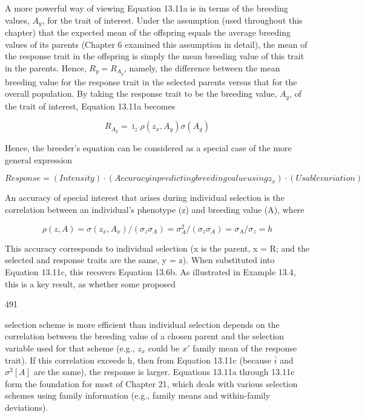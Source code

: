 \documentclass{article}
\begin{document}
A more powerful way of viewing Equation 13.11a is in terms of the breeding values,  $ A_{y} $, for the trait of interest. Under the assumption (used throughout this chapter) that the expected mean of the offspring equals the average breeding values of its parents (Chapter 6 examined this assumption in detail), the mean of the response trait in the offspring is simply the mean breeding value of this trait in the parents. Hence,  $ R_{y} = R_{A_{y}} $, namely, the difference between the mean breeding value for the response trait in the selected parents versus that for the overall population. By taking the response trait to be the breeding value,  $ A_{y} $, of the trait of interest, Equation 13.11a becomes

\begin{equation}
R_{A_{y}}=\bar{\imath}_{z}\rho(z_{x},A_{y})\sigma(A_{y})
\tag{13.11c}
\label{eq:13_11c}
\end{equation}

Hence, the breeder’s equation can be considered as a special case of the more general expression

\begin{equation}
Response=(Intensity)\cdot(Accuracy in predicting breeding value using z_{x})\cdot(Usable variation)
\tag{13.11d}
\label{eq:13_11d}
\end{equation}

An accuracy of special interest that arises during individual selection is the correlation between an individual's phenotype (z) and breeding value (A), where

\begin{equation}
\rho(z,A)=\sigma(z_{x},A_{x})/(\sigma_{z}\sigma_{A})=\sigma_{A}^{2}/(\sigma_{z}\sigma_{A})=\sigma_{A}/\sigma_{z}=h
\tag{13.11e}
\label{eq:13_11e}
\end{equation}

This accuracy corresponds to individual selection (x is the parent, x = R; and the selected and response traits are the same, y = z). When substituted into Equation 13.11c, this recovers Equation 13.6b. As illustrated in Example 13.4, this is a key result, as whether some proposed

491

selection scheme is more efficient than individual selection depends on the correlation between the breeding value of a chosen parent and the selection variable used for that scheme (e.g.,  $ z_{x} $ could be  $ x' $ family mean of the response trait). If this correlation exceeds h, then from Equation 13.11c (because  $ \bar{i} $ and  $ \sigma^{2}[A] $ are the same), the response is larger. Equations 13.11a through 13.11c form the foundation for most of Chapter 21, which deals with various selection schemes using family information (e.g., family means and within-family deviations).
\end{document}
